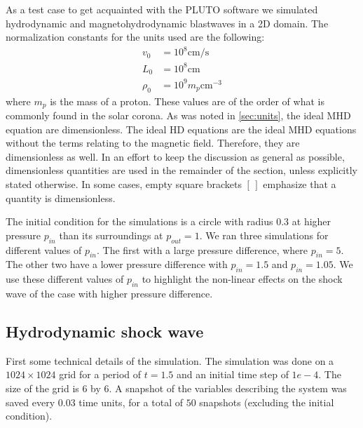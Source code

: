 As a test case to get acquainted with the PLUTO software we simulated hydrodynamic and magnetohydrodynamic blastwaves in a 2D domain.
The normalization constants for the units used are the following:
\begin{align*}
	v_0 &= 10^8 \text{cm/s}\\
	L_0 &= 10^8 \text{cm}\\
	\rho_0 &= 10^9 m_p \text{cm}^{-3}
\end{align*}
where $m_p$ is the mass of a proton. These values are of the order of what is commonly found in the solar corona. 
As was noted in \cref{sec:units}, the ideal MHD equation are dimensionless.
The ideal HD equations are the ideal MHD equations without the terms relating to the magnetic field. Therefore, they are dimensionless as well.
In an effort to keep the discussion as general as possible, dimensionless quantities are used in the remainder of the section, unless explicitly stated otherwise.
In some cases, empty square brackets $[\,]$ emphasize that a quantity is dimensionless.

The initial condition for the simulations is a circle with radius $0.3$ at higher pressure $p_{in}$ than its surroundings at $p_{out} = 1$.
We ran three simulations for different values of $p_{in}$.
The first with a large pressure difference, where $p_{in} = 5$. The other two have a lower pressure difference with $p_{in} = 1.5$ and  $p_{in}=1.05$.
We use these different values of $p_{in}$ to highlight the non-linear effects on the shock wave of the case with higher pressure difference.

\subsection{Hydrodynamic shock wave}
First some technical details of the simulation.
The simulation was done on a $1024 \times 1024$ grid for a period of $t=1.5$ and an initial time step of $1e-4$.
The size of the grid is $6$ by $6$.
A snapshot of the variables describing the system was saved every $0.03$ time units, for a total of $50$ snapshots (excluding the initial condition).


